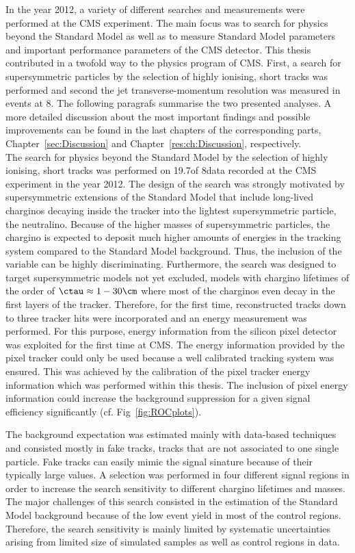 In the year 2012, a variety of different searches and measurements were performed at the CMS experiment.
The main focus was to search for physics beyond the Standard Model as well as to measure Standard Model parameters and important performance parameters of the CMS detector.
This thesis contributed in a twofold way to the physics program of CMS.
First, a search for supersymmetric particles by the selection of highly ionising, short tracks was performed and second the jet transverse-momentum resolution was measured in \GAMJET events at 8\tev.
The following paragrafs summarise the two presented analyses.
A more detailed discussion about the most important findings and possible improvements can be found in the last chapters of the corresponding parts, Chapter~\ref{sec:Discussion} and Chapter~\ref{res:ch:Discussion}, respectively.\\

The search for physics beyond the Standard Model by the selection of highly ionising, short tracks was performed on 19.7\fbinv of 8\tev data recorded at the CMS experiment in the year 2012.
The design of the search was strongly motivated by supersymmetric extensions of the Standard Model that include long-lived charginos decaying inside the tracker into the lightest supersymmetric particle, the neutralino.
Because of the higher masses of supersymmetric particles, the chargino is expected to deposit much higher amounts of energies in the tracking system compared to the Standard Model background.
Thus, the inclusion of the variable \dedx can be highly discriminating.
Furthermore, the search was designed to target supersymmetric models not yet excluded, \ie models with chargino lifetimes of the order of $\ctau \approx 1- 30\cm$ where most of the charginos even decay in the first layers of the tracker.
Therefore, for the first time, reconstructed tracks down to three tracker hits were incorporated and an energy measurement was performed.
For this purpose, energy information from the silicon pixel detector was exploited for the first time at CMS.
The energy information provided by the pixel tracker could only be used because a well calibrated tracking system was ensured.
This was achieved by the calibration of the pixel tracker energy information which was performed within this thesis.
The inclusion of pixel energy information could increase the background suppression for a given signal efficiency significantly (cf. Fig~\ref{fig:ROCplots}).

The background expectation was estimated mainly with data-based techniques and consisted mostly in fake tracks, \ie tracks that are not associated to one single particle. 
Fake tracks can easily mimic the signal sinature because of their typically large \dedx values.
A selection was performed in four different signal regions in order to increase the search sensitivity to different chargino lifetimes and masses.
The major challenges of this search consisted in the estimation of the Standard Model background because of the low event yield in most of the control regions.
Therefore, the search sensitivity is mainly limited by systematic uncertainties arising from limited size of simulated samples as well as control regions in data.

